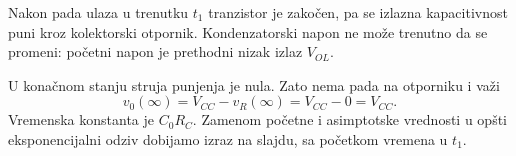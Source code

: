 Nakon pada ulaza u trenutku $t_1$ tranzistor je zakočen, pa se izlazna kapacitivnost puni kroz kolektorski otpornik. Kondenzatorski napon ne može trenutno da se promeni: početni napon je prethodni nizak izlaz $V_{OL}$.

U konačnom stanju struja punjenja je nula. Zato nema pada na otporniku i važi
\[v_0(\infty)=V_{CC}-v_R(\infty)=V_{CC}-0=V_{CC}.\]
Vremenska konstanta je $C_0R_C$. Zamenom početne i asimptotske vrednosti u opšti eksponencijalni odziv dobijamo izraz na slajdu, sa početkom vremena u $t_1$.

